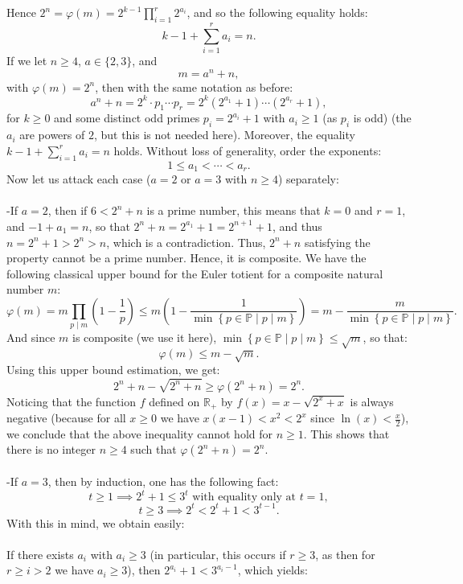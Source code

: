 \documentclass[11pt, a4paper, oneside]{article}
\theoremstyle{remark}
\theoremstyle{lemma}
\begin{document}
Hence \(2^n = \varphi(m) = 2^{k-1} \prod_{i=1}^r 2^{a_i}\), and so the following equality holds:
\[
k - 1 + \sum_{i=1}^r a_i = n.
\]
If we let \(n \geq 4\), \(a \in \{2,3\}\), and
\[
m = a^n + n,
\]
with \(\varphi(m) = 2^n\), then with the same notation as before:
\[
a^n + n = 2^k \cdot p_1 \cdots p_r = 2^k \left(2^{a_1} + 1\right) \cdots \left(2^{a_r} + 1\right),
\]
for \(k \geq 0\) and some distinct odd primes \(p_i = 2^{a_i} + 1\) with \(a_i \geq 1\) (as \(p_i\) is odd) (the \(a_i\) are powers of \(2\), but this is not needed here). Moreover, the equality \(k - 1 + \sum_{i=1}^r a_i = n\) holds. Without loss of generality, order the exponents:
\[
1 \leq a_1 < \cdots < a_r.
\]
Now let us attack each case ($a=2$ or $a=3$ with $n\geq 4$) separately:
\\\\
-If \(a = 2\), then if \(6 < 2^n + n\) is a prime number, this means that \(k = 0\) and \(r = 1\), and \(-1 + a_1 = n\), so that \(2^n + n = 2^{a_1} + 1 = 2^{n+1} + 1\), and thus \(n = 2^n + 1 > 2^n > n\), which is a contradiction. Thus, \(2^n + n\) satisfying the property cannot be a prime number. Hence, it is composite. We have the following classical upper bound for the Euler totient for a composite natural number \(m\):
\[
\varphi(m) = m \prod_{p \mid m} \left(1 - \frac{1}{p}\right) \leq m \left(1 - \frac{1}{\min \left\{ p \in \mathbb{P} \mid p \mid m \right\}}\right) = m - \frac{m}{\min \left\{ p \in \mathbb{P} \mid p \mid m \right\}}.
\]
And since \(m\) is composite (we use it here), \(\min \left\{ p \in \mathbb{P} \mid p \mid m \right\} \leq \sqrt{m}\), so that:
\[
\varphi(m) \leq m - \sqrt{m}.
\]
Using this upper bound estimation, we get:
\[
2^n + n - \sqrt{2^n + n} \geq \varphi \left(2^n + n\right) = 2^n.
\]
Noticing that the function \(f\) defined on \(\mathbb{R}_+\) by \(f(x) = x - \sqrt{2^x + x}\) is always negative (because for all $x\geq 0$ we have $x(x-1)<x^2<2^x$ since $\ln(x)<\frac{x}{2}$), we conclude that the above inequality cannot hold for \(n \geq 1\). This shows that there is no integer \(n \geq 4\) such that \(\varphi(2^n + n) = 2^n\).
\\\\
-If \(a = 3\), then by induction, one has the following fact:
\[
t \geq 1 \implies 2^t + 1 \leq 3^t \text{ with equality only at } t = 1,
\]
\[
t \geq 3 \implies 2^t < 2^t + 1 < 3^{t-1}.
\]
With this in mind, we obtain easily:
\\\\
If there exists \(a_i\) with \(a_i \geq 3\) (in particular, this occurs if \(r \geq 3\), as then for \(r \geq i > 2\) we have \(a_i \geq 3\)), then \(2^{a_i} + 1 < 3^{a_i - 1}\), which yields:
\end{document}
